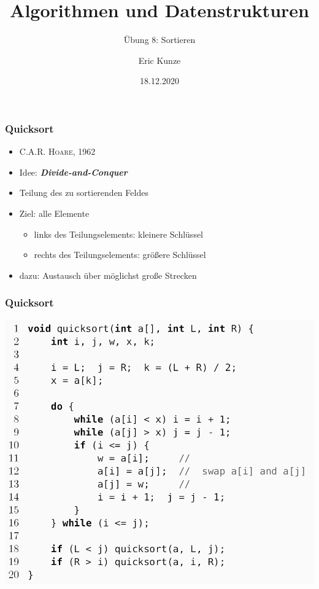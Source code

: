 \documentclass{beamer}
\begin{document}
	
	\title{Algorithmen und Datenstrukturen}
	\subtitle{Übung 8: Sortieren}
	\author{Eric Kunze}
	\date{18.12.2020}

	\maketitle



\begin{frame} \frametitle{Quicksort}
	\begin{itemize}
		\item \textsc{C.A.R. Hoare}, 1962
		\item Idee: \textit{\textbf{Divide-and-Conquer}}
		\item Teilung des zu sortierenden Feldes
		\item Ziel: alle Elemente
		\begin{itemize}
			\item links des Teilungselements: kleinere Schlüssel
			\item rechts des Teilungselements: größere Schlüssel
		\end{itemize}
	\item dazu: Austausch über möglichst große Strecken
	\end{itemize}
\end{frame}

\begin{frame} \frametitle{Quicksort}
	\centering
	\includegraphics[height=.95\textheight]{./tut08_quicksort.jpg}
\end{frame}
\end{document}
